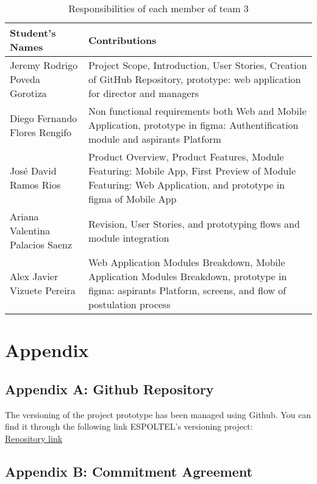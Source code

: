 \documentclass{scrreprt}
\begin{document}
\begin{table}[h!]
    \centering \small
    \renewcommand{\arraystretch}{1.5} %
    \begin{tabular}{|p{5cm}|p{10cm}|} %
    \hline
    \textbf{Student's Names} & \textbf{Contributions} \\ \hline
    Jeremy Rodrigo Poveda Gorotiza & Project Scope, Introduction, User Stories, Creation of GitHub Repository, prototype: web application for director and managers \\ \hline
    Diego Fernando Flores Rengifo & Non functional requirements both Web and Mobile Application, prototype in figma: Authentification module and aspirants Platform  \\ \hline
    José David Ramos Rios & Product Overview, Product Features, Module Featuring: Mobile App, First Preview of Module Featuring: Web Application, and prototype in figma of Mobile App \\ \hline
    Ariana Valentina Palacios Saenz & Revision, User Stories, and prototyping flows and module integration\\ \hline
    Alex Javier Vizuete Pereira & Web Application Modules Breakdown, Mobile Application Modules Breakdown, prototype in figma: aspirants Platform, screens, and flow of postulation process\\ \hline
    \end{tabular}
    \caption{Responsibilities of each member of team 3}
\end{table} \FloatBarrier 



\chapter{Appendix}

\section{Appendix A: Github Repository}
The versioning of the project prototype has been managed using Github. You can find it through the following link ESPOLTEL's versioning project:\\ \href{https://github.com/Jeremy-Poveda/EspoltelHiringManager}{Repository link}
\section{Appendix B: Commitment Agreement}
 
\end{document}
